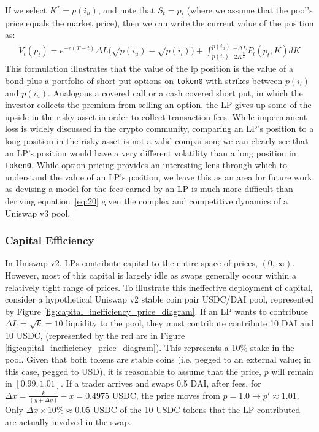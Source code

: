 \documentclass[11pt]{article}
\begin{document}
If we select $K^* = p(i_u)$, and note that $S_t = p_t$ (where we assume that the pool's price equals the market price), then we can write the current value of the position as:
\begin{gather}
    V_t(p_t) = e^{-r(T-t)} \Delta L \big( \sqrt{p(i_u)} - \sqrt{p(i_l)} \big)
    + \int_{p(i_l)}^{p(i_u)} \frac{-\Delta L}{2 K^{\frac{3}{2}}} P_t(p_t, K) dK \label{eq:20}
\end{gather}
This formulation illustrates that the value of the \gls{lp} position is the value of a bond plus a portfolio of short put options on \texttt{token0} with strikes between $p(i_l)$ and $p(i_u)$. Analogous a covered call or a cash covered short put, in which the investor collects the premium from selling an option, the LP gives up some of the upside in the risky asset in order to collect transaction fees. While impermanent loss is widely discussed in the crypto community, comparing an LP's position to a long position in the risky asset is not a valid comparison; we can clearly see that an LP's position would have a very different volatility than a long position in \texttt{token0}. While option pricing provides an interesting lens through which to understand the value of an LP's position, we leave this as an area for future work as devising a model for the fees earned by an LP is much more difficult than deriving equation~\eqref{eq:20} given the complex and competitive dynamics of a Uniswap v3 pool.

\subsubsection{Capital Efficiency}

In Uniswap v2, LPs contribute capital to the entire space of prices, $(0, \infty)$. However, most of this capital is largely idle as swaps generally occur within a relatively tight range of prices. To illustrate this ineffective deployment of capital, consider a hypothetical Uniswap v2 stable coin pair USDC/DAI pool, represented by Figure \ref{fig:capital_inefficiency_price_diagram}. If an LP wants to contribute $\Delta L = \sqrt{k} = 10$ liquidity to the pool, they must contribute contribute 10 DAI and 10 USDC, (represented by the red are in Figure \ref{fig:capital_inefficiency_price_diagram}). This represents a 10\% stake in the pool. Given that both tokens are stable coins (i.e. pegged to an external value; in this case, pegged to USD), it is reasonable to assume that the price, $p$ will remain in $[0.99, 1.01]$. If a trader arrives and swaps 0.5 DAI, after fees, for $\Delta x = \frac{k}{(y + \Delta y)} - x = 0.4975$ USDC, the price moves from $p = 1.0 \to p' \approx 1.01$. Only $\Delta x \times 10\% \approx 0.05$ USDC of the 10 USDC tokens that the LP contributed are actually involved in the swap.
\end{document}
